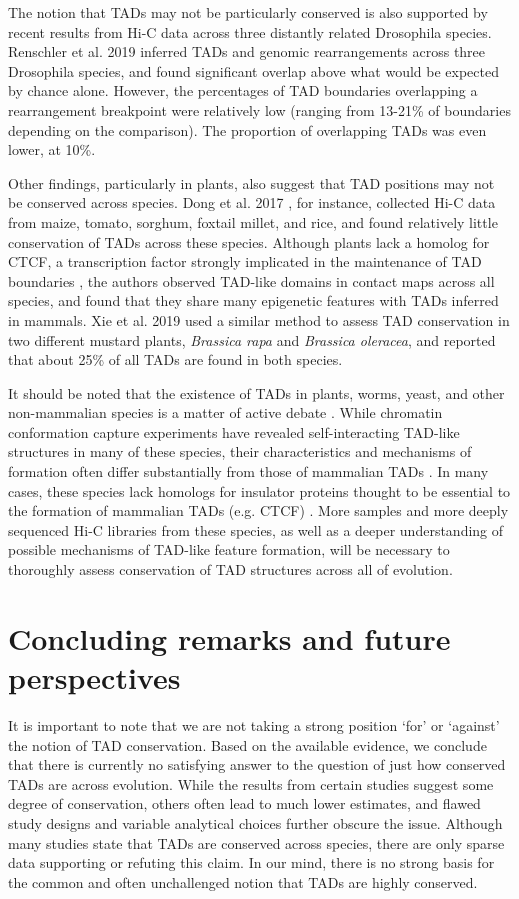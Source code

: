 The notion that TADs may not be particularly conserved is also supported by recent results from Hi-C data across three distantly related Drosophila species. Renschler et al. 2019 \cite{Renschler.2019} inferred TADs and genomic rearrangements across three Drosophila species, and found significant overlap above what would be expected by chance alone. However, the percentages of TAD boundaries overlapping a rearrangement breakpoint were relatively low (ranging from 13-21\% of boundaries depending on the comparison). The proportion of overlapping TADs was even lower, at 10\%.
 
Other findings, particularly in plants, also suggest that TAD positions may not be conserved across species. Dong et al. 2017 \cite{Dong.2017}, for instance, collected Hi-C data from maize, tomato, sorghum, foxtail millet, and rice, and found relatively little conservation of TADs across these species. Although plants lack a homolog for CTCF, a transcription factor strongly implicated in the maintenance of TAD boundaries \cite{Guo.2015, Rudan.2015, Kentepozidou.2020, Gomez-marin.2015}, the authors observed TAD-like domains in contact maps across all species, and found that they share many epigenetic features with TADs inferred in mammals. Xie et al. 2019 \cite{Xie.2019} used a similar method to assess TAD conservation in two different mustard plants, \textit{Brassica rapa} and \textit{Brassica oleracea}, and reported that about 25\% of all TADs are found in both species.

It should be noted that the existence of TADs in plants, worms, yeast, and other non-mammalian species is a matter of active debate \cite{Bonev.2016}. While chromatin conformation capture experiments have revealed self-interacting TAD-like structures in many of these species, their characteristics and mechanisms of formation often differ substantially from those of mammalian TADs \cite{Szabo.2019, Acemel.2017}. In many cases, these species lack homologs for insulator proteins thought to be essential to the formation of mammalian TADs (e.g. CTCF) \cite{Szabo.2019}. More samples and more deeply sequenced Hi-C libraries from these species, as well as a deeper understanding of possible mechanisms of TAD-like feature formation, will be necessary to thoroughly assess conservation of TAD structures across all of evolution.

\section{Concluding remarks and future perspectives}
It is important to note that we are not taking a strong position `for' or `against' the notion of TAD conservation. Based on the available evidence, we conclude that there is currently no satisfying answer to the question of just how conserved TADs are across evolution. While the results from certain studies suggest some degree of conservation, others often lead to much lower estimates, and flawed study designs and variable analytical choices further obscure the issue. Although many studies state that TADs are conserved across species, there are only sparse data supporting or refuting this claim. In our mind, there is no strong basis for the common and often unchallenged notion that TADs are highly conserved. 

